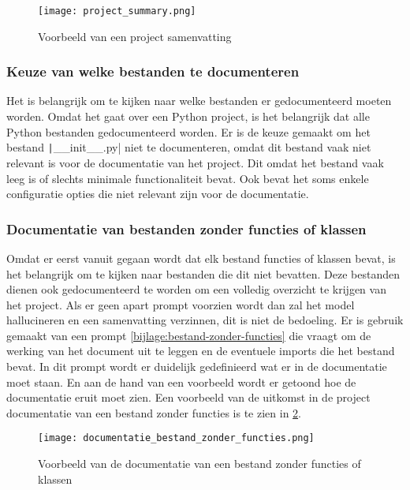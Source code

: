 \begin{figure}[h]
    \centering
    \texttt{[image: project\_summary.png]}
    \caption{Voorbeeld van een project samenvatting}
    \label{fig:project-summary}
\end{figure}    

\subsubsection{Keuze van welke bestanden te documenteren}
\label{subsec:project-documentatie-keuze-bestanden}

Het is belangrijk om te kijken naar welke bestanden er gedocumenteerd moeten worden.
Omdat het gaat over een Python project, is het belangrijk dat alle Python bestanden gedocumenteerd worden.
Er is de keuze gemaakt om het bestand \texttt|__init__.py| niet te documenteren, omdat dit bestand vaak niet relevant is voor de documentatie van het project.
Dit omdat het bestand vaak leeg is of slechts minimale functionaliteit bevat. 
Ook bevat het soms enkele configuratie opties die niet relevant zijn voor de documentatie.

\subsubsection{Documentatie van bestanden zonder functies of klassen}
\label{subsec:project-documentatie-geen-functies}

Omdat er eerst vanuit gegaan wordt dat elk bestand functies of klassen bevat, is het belangrijk om te kijken naar bestanden die dit niet bevatten.
Deze bestanden dienen ook gedocumenteerd te worden om een volledig overzicht te krijgen van het project.
Als er geen apart prompt voorzien wordt dan zal het model hallucineren en een samenvatting verzinnen, dit is niet de bedoeling.
Er is gebruik gemaakt van een prompt \ref{bijlage:bestand-zonder-functies} die vraagt om de werking van het document uit te leggen en de eventuele imports die het bestand bevat.
In dit prompt wordt er duidelijk gedefinieerd wat er in de documentatie moet staan. 
En aan de hand van een voorbeeld wordt er getoond hoe de documentatie eruit moet zien.
Een voorbeeld van de uitkomst in de project documentatie van een bestand zonder functies is te zien in \ref{fig:file-no-functions}.

\begin{figure}[h]
    \centering
    \texttt{[image: documentatie\_bestand\_zonder\_functies.png]}
    \caption{Voorbeeld van de documentatie van een bestand zonder functies of klassen}
    \label{fig:file-no-functions}
\end{figure}

